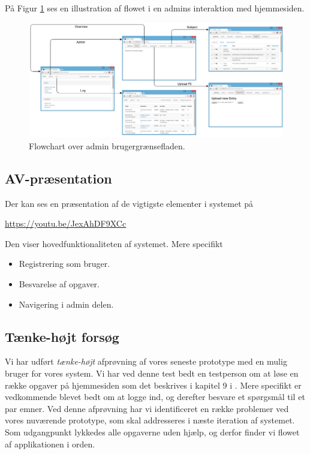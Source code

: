 \documentclass[11pt, a4paper]{article}
\begin{document}
På Figur \ref{fig:flow_chart_admin} ses en illustration af flowet i en admins interaktion med hjemmesiden.

\begin{figure}[htpb]
    \centering
    \includegraphics[width=1\linewidth]{figures/interface/flow_admin.png}
    \caption{Flowchart over admin brugergrænsefladen.}
    \label{fig:flow_chart_admin}
\end{figure}
\FloatBarrier

\subsection{AV-præsentation}
\label{sub:av_praesentation}

Der kan ses en præsentation af de vigtigste elementer i systemet på
\begin{framed}
    \centering
    \url{https://youtu.be/JexAhDF9XCc}
\end{framed}
Den viser hovedfunktionaliteten af systemet. Mere specifikt
\begin{itemize}
    \item Registrering som bruger.
    \item Besvarelse af opgaver.
    \item Navigering i admin delen.
\end{itemize}

\subsection{Tænke-højt forsøg}
\label{sub:taenke_hoejt}
Vi har udført \emph{tænke-højt} afprøvning af vores seneste prototype med en mulig bruger for vores system. Vi har ved denne test bedt en testperson om at løse en række opgaver på hjemmesiden som det beskrives i kapitel 9 i \cite{molich}. Mere specifikt er vedkommende blevet bedt om at logge ind, og derefter besvare et spørgsmål til et par emner. Ved denne afprøvning har vi identificeret en række problemer ved vores nuværende prototype, som skal addresseres i næste iteration af systemet. Som udgangpunkt lykkedes alle opgaverne uden hjælp, og derfor finder vi flowet af applikationen i orden.
\end{document}
